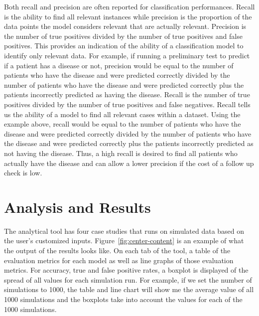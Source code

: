 \documentclass{llncs}
\begin{document}
\noindent 
Both recall and precision are often reported for classification performances.  Recall is the ability to find all relevant instances while precision is the proportion of the data points the model considers relevant that are actually relevant.  Precision is the number of true positives divided by the number of true positives and false positives.  This provides an indication of the ability of a classification model to identify only relevant data.  For example, if running a preliminary test to predict if a patient has a disease or not, precision would be equal to the number of patients who have the disease and were predicted correctly divided by the number of patients who have the disease and were predicted correctly plus the patients incorrectly predicted as having the disease.  Recall is the number of true positives divided by the number of true positives and false negatives. Recall tells us the ability of a model to find all relevant cases within a dataset.  Using the example above, recall would be equal to the number of patients who have the disease and were predicted correctly divided by the number of patients who have the disease and were predicted correctly plus the patients incorrectly predicted as not having the disease. Thus, a high recall is desired to find all patients who actually have the disease and can allow a lower precision if the cost of a follow up check is low.

\section{Analysis and Results}
\noindent 
The analytical tool has four case studies that runs on simulated data based on the user's customized inputs. Figure~\ref{fig:center-content} is an example of what the output of the results looks like.  On each tab of the tool, a table of the evaluation metrics for each model as well as line graphs of those evaluation metrics.  For accuracy, true and false positive rates, a boxplot is displayed of the spread of all values for each simulation run.  For example, if we set the number of simulations to 1000, the table and line chart will show me the average value of all 1000 simulations and the boxplots take into account the  values for each of the 1000 simulations.
\end{document}
